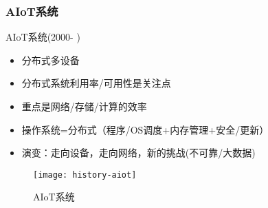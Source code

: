 \begin{frame}[plain]
	
	\frametitle{AIoT系统}
	
	AIoT系统(2000- )

	\begin{itemize}
		\item 分布式多设备
		\item 分布式系统利用率/可用性是关注点	
		\item 重点是网络/存储/计算的效率
		\item 操作系统=分布式（程序/OS调度+内存管理+安全/更新）
		\item 演变：走向设备，走向网络，新的挑战(不可靠/大数据)
	\end{itemize}
	
	\begin{figure}
		\centering
		\texttt{[image: history-aiot]}
		\caption{AIoT系统}
	\end{figure}
	
\end{frame}




